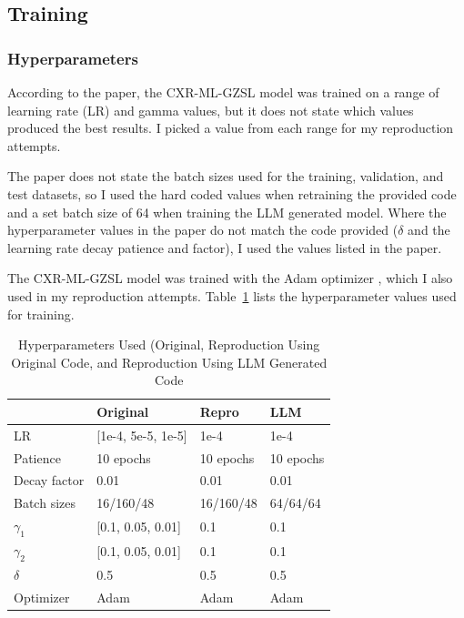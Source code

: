 \documentclass[letterpaper]{article} %
\begin{document}
\subsection{Training}

\subsubsection{Hyperparameters}

According to the paper, the CXR-ML-GZSL model was trained on a range of learning rate (LR) and gamma values, but it does not state which values produced the best results. I picked a value from each range for my reproduction attempts.

The paper does not state the batch sizes used for the training, validation, and test datasets, so I used the hard coded values when retraining the provided code and a set batch size of 64 when training the LLM generated model. Where the hyperparameter values in the paper do not match the code provided ($\delta$ and the learning rate decay patience and factor), I used the values listed in the paper.

The CXR-ML-GZSL model was trained with the Adam optimizer \cite{kingma2017adammethodstochasticoptimization}, which I also used in my reproduction attempts. Table~\ref{tab:hyperparameters} lists the hyperparameter values used for training.

\begin{table}[h!]
\centering
\begin{tabular}{|l|l|l|l|}
\hline
\textbf{} & \textbf{Original} & \textbf{Repro} & \textbf{LLM} \\
\hline
LR & [1e-4, 5e-5, 1e-5] & 1e-4 & 1e-4 \\
Patience & 10 epochs & 10 epochs & 10 epochs \\
Decay factor & 0.01 & 0.01 & 0.01 \\
Batch sizes & 16/160/48 & 16/160/48 & 64/64/64 \\
$\gamma_1$ & [0.1, 0.05, 0.01] & 0.1 & 0.1 \\
$\gamma_2$ & [0.1, 0.05, 0.01] & 0.1 & 0.1 \\
$\delta$ & 0.5 & 0.5 & 0.5 \\
Optimizer & Adam & Adam & Adam \\
\hline
\end{tabular}
\caption{Hyperparameters Used (Original, Reproduction Using Original Code, and Reproduction Using LLM Generated Code}
\label{tab:hyperparameters}
\end{table}
\end{document}
